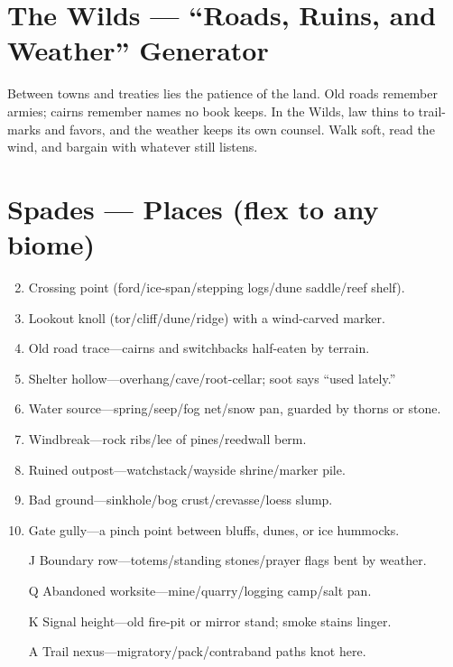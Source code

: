 \section{The Wilds --- ``Roads, Ruins, and Weather'' Generator}
\label{chap:wilderness}

\noindent
Between towns and treaties lies the patience of the land. Old roads remember armies; cairns remember names no book keeps. In the Wilds, law thins to trail-marks and favors, and the weather keeps its own counsel. Walk soft, read the wind, and bargain with whatever still listens.

\section*{Spades --- Places (flex to any biome)}
\label{sec:wilderness-places}
\begin{enumerate}
\setcounter{enumi}{1}
\item Crossing point (ford/ice-span/stepping logs/dune saddle/reef shelf).
\item Lookout knoll (tor/cliff/dune/ridge) with a wind-carved marker.
\item Old road trace---cairns and switchbacks half-eaten by terrain.
\item Shelter hollow---overhang/cave/root-cellar; soot says ``used lately.''
\item Water source---spring/seep/fog net/snow pan, guarded by thorns or stone.
\item Windbreak---rock ribs/lee of pines/reedwall berm.
\item Ruined outpost---watchstack/wayside shrine/marker pile.
\item Bad ground---sinkhole/bog crust/crevasse/loess slump.
\item Gate gully---a pinch point between bluffs, dunes, or ice hummocks.
\item[J] Boundary row---totems/standing stones/prayer flags bent by weather.
\item[Q] Abandoned worksite---mine/quarry/logging camp/salt pan.
\item[K] Signal height---old fire-pit or mirror stand; smoke stains linger.
\item[A] Trail nexus---migratory/pack/contraband paths knot here.
\end{enumerate}

